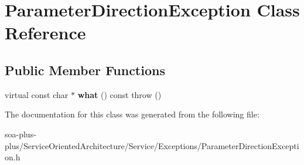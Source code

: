 \hypertarget{class_parameter_direction_exception}{
\section{ParameterDirectionException Class Reference}
\label{class_parameter_direction_exception}
}
\subsection*{Public Member Functions}
\begin{DoxyCompactItemize}
\item 
\hypertarget{class_parameter_direction_exception_ac4b5bf12ddf0dbe5b3aaa447e455c2c7}{
virtual const char $\ast$ {\bfseries what} () const   throw ()}
\label{class_parameter_direction_exception_ac4b5bf12ddf0dbe5b3aaa447e455c2c7}

\end{DoxyCompactItemize}


The documentation for this class was generated from the following file:\begin{DoxyCompactItemize}
\item 
soa-\/plus-\/plus/ServiceOrientedArchitecture/Service/Exceptions/ParameterDirectionException.h\end{DoxyCompactItemize}
